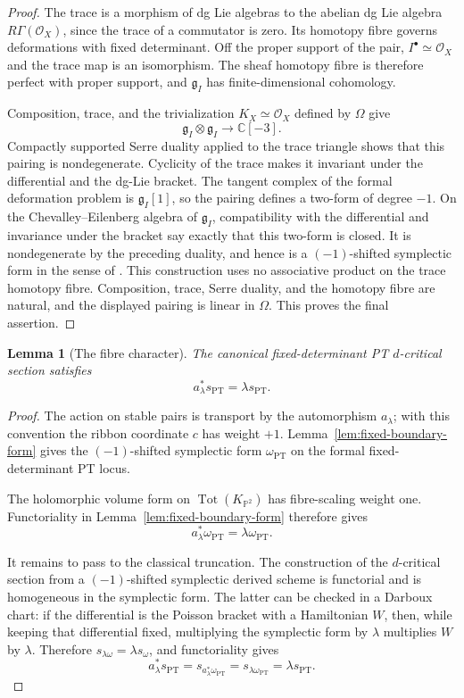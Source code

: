 \documentclass[11pt,reqno]{amsart}
\newtheorem{lemma}[theorem]{Lemma}
\theoremstyle{definition}
\newcommand{\C}{\mathbb C}
\newcommand{\Pp}{\mathbb P}
\newcommand{\Ocal}{\mathcal O}
\newcommand{\Tot}{\operatorname{Tot}}
\newcommand{\PT}{\operatorname{PT}}
\begin{document}
\begin{proof}
The trace is a morphism of dg Lie algebras to the abelian dg Lie algebra
$R\Gamma(\Ocal_X)$, since the trace of a commutator is zero.  Its homotopy
fibre governs deformations with fixed determinant.  Off the proper support
of the pair, $I^\bullet\simeq\Ocal_X$ and the trace map is an isomorphism.
The sheaf homotopy fibre is therefore perfect with proper support, and
$\mathfrak g_I$ has finite-dimensional cohomology.

Composition, trace, and the trivialization $K_X\simeq\Ocal_X$ defined by
$\Omega$ give
\[
 \mathfrak g_I\otimes\mathfrak g_I\longrightarrow\C[-3].
\]
Compactly supported Serre duality applied to the trace triangle shows that
this pairing is nondegenerate.  Cyclicity of the trace makes it invariant
under the differential and the dg-Lie bracket.  The tangent complex of the
formal deformation problem is $\mathfrak g_I[1]$, so the pairing defines a
two-form of degree $-1$.  On the Chevalley--Eilenberg algebra of
$\mathfrak g_I$, compatibility with the differential and invariance under
the bracket say exactly that this two-form is closed.  It is nondegenerate
by the preceding duality, and hence is a $(-1)$-shifted symplectic form in
the sense of \cite{PTVV}.  This construction uses no associative product on
the trace homotopy fibre.  Composition, trace, Serre duality, and the
homotopy fibre are natural, and the displayed pairing is linear in
$\Omega$.  This proves the final assertion.
\end{proof}

\begin{lemma}[The fibre character]
\label{lem:degree-two-fibre-character}
The canonical fixed-determinant PT $d$-critical section satisfies
\[
 a_\lambda^*s_{\PT}=\lambda s_{\PT}.
\]
\end{lemma}

\begin{proof}
The action on stable pairs is transport by the automorphism $a_\lambda$;
with this convention the ribbon coordinate $c$ has weight $+1$.
Lemma~\ref{lem:fixed-boundary-form} gives the $(-1)$-shifted symplectic form
$\omega_{\PT}$ on the formal fixed-determinant PT locus.

The holomorphic volume form on $\Tot(K_{\Pp^2})$ has fibre-scaling weight
one.  Functoriality in Lemma~\ref{lem:fixed-boundary-form} therefore gives
\[
 a_\lambda^*\omega_{\PT}=\lambda\omega_{\PT}.
\]

It remains to pass to the classical truncation.  The construction of the
$d$-critical section from a $(-1)$-shifted symplectic derived scheme is
functorial \cite[Theorem~6.6]{BravBussiJoyce} and is homogeneous in the
symplectic form.  The latter can be checked in a Darboux chart: if the
differential is the Poisson bracket with a Hamiltonian $W$, then, while
keeping that differential fixed, multiplying the symplectic form by
$\lambda$ multiplies $W$ by $\lambda$.  Therefore
$s_{\lambda\omega}=\lambda s_\omega$, and functoriality gives
\[
 a_\lambda^*s_{\PT}
 =s_{a_\lambda^*\omega_{\PT}}
 =s_{\lambda\omega_{\PT}}
 =\lambda s_{\PT}.
\]
\end{proof}
\end{document}
